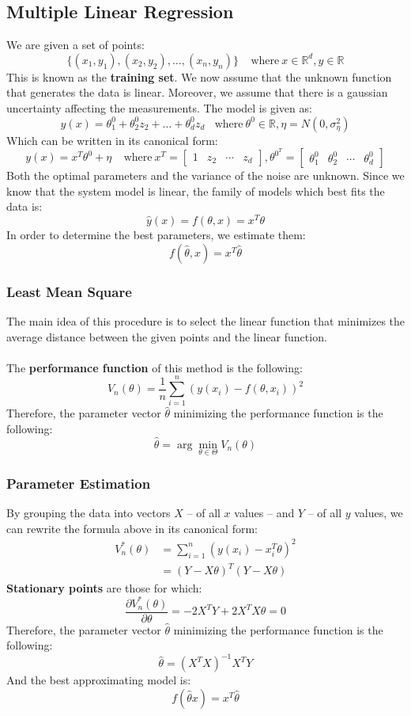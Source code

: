 \documentclass{article}
\begin{document}
\subsection{Multiple Linear Regression}
We are given a set of points:
\[ \{ (x_1, y_1), (x_2, y_2), \dots, (x_n, y_n) \} ~~~~~ \text{where}~x \in \mathbb{R}^d, y \in 	\mathbb{R} \]
This is known as the \textbf{training set}. We now assume that the unknown function that generates the data is linear. Moreover, we assume that there is a gaussian uncertainty affecting the measurements. The model is given as:
\[ y(x) = \theta^0_1 + \theta^0_2 z_2 + \dots + \theta^0_d z_d ~~~~ \text{where}~\theta^0 \in \mathbb{R}, \eta = N(0, \sigma^2_\eta) \]
Which can be written in its canonical form:
\[ y(x) = x^T \theta^0 + \eta ~~~~~ \text{where}~x^T = \begin{bmatrix} 1 & z_2 & \cdots & z_d \end{bmatrix}, \theta^{0^T} = \begin{bmatrix} \theta^0_1 & \theta^0_2 & \cdots & \theta^0_d \end{bmatrix} \]
Both the optimal parameters and the variance of the noise are unknown. Since we know that the system model is linear, the family of models which best fits the data is:
\[ \hat y(x) = f(\theta, x) = x^T \theta \]
In order to determine the best parameters, we estimate them:
\[ f(\hat \theta, x) = x^T \hat \theta \]

\subsubsection{Least Mean Square}
The main idea of this procedure is to select the linear function that minimizes the average distance between the given points and the linear function. \\ \\
The \textbf{performance function} of this method is the following:
\[ V_n(\theta) = \frac{1}{n} \sum^n_{i=1}(y(x_i) - f(\theta, x_i))^2 \]
Therefore, the parameter vector $\hat \theta$ minimizing the performance function is the following:
\[ \hat \theta  = \arg\min_{\theta \in \Theta} V_n(\theta) \]

\subsubsection{Parameter Estimation}
By grouping the data into vectors $X$ -- of all $x$ values -- and $Y$ -- of all $y$ values, we can rewrite the formula above in its canonical form:
\begin{align*}
	V_n^*(\theta) &= \sum^n_{i=1} (y(x_i) - x^T_i \theta)^2 \\
	&= (Y - X\theta)^T (Y - X\theta) 
\end{align*}
\textbf{Stationary points} are those for which:
\[ \frac{\partial V_n^*(\theta)}{\partial \theta} = -2X^T Y + 2X^T X \theta = 0 \]
Therefore, the parameter vector $\hat \theta$ minimizing the performance function is the following:
\[ \hat \theta = (X^TX)^{-1}X^TY \]
And the best approximating model is:
\[ f(\hat \theta x) = x^T\hat\theta \]
\end{document}
